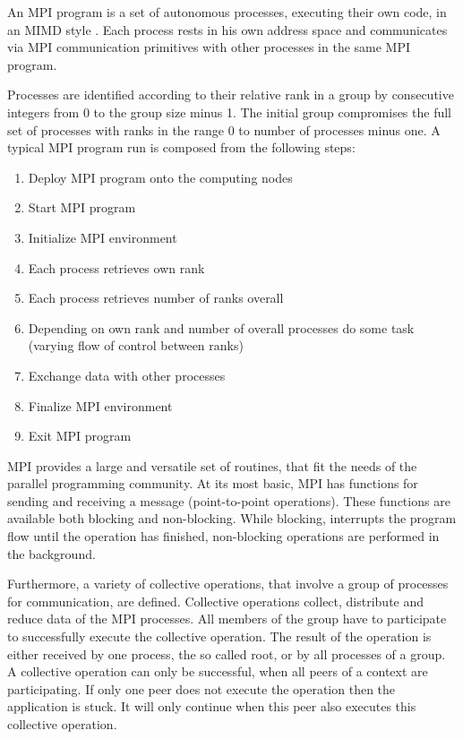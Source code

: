 An MPI program is a set of autonomous processes, executing their own
code, in an MIMD style \cite{Flynn:1972:COE:1952456.1952459}. Each
process rests in his own address space and communicates via MPI
communication primitives with other processes in the same MPI
program.

Processes are identified according to their relative rank in a group
by consecutive integers from 0 to the group size minus 1. The
initial group compromises the full set of processes with ranks in the
range 0 to number of processes minus one. A typical MPI program run is
composed from the following steps:

\begin{enumerate}
\item Deploy MPI program onto the computing nodes
\item Start MPI program
\item Initialize MPI environment
\item Each process retrieves own rank
\item Each process retrieves number of ranks overall
\item Depending on own rank and number of overall processes do some task\\
  (varying flow of control between ranks)
\item Exchange data with other processes
\item Finalize MPI environment
\item Exit MPI program
\end{enumerate}

MPI provides a large and versatile set of routines, that fit the needs
of the parallel programming community. At its most basic, MPI has
functions for sending and receiving a message (point-to-point
operations).  These functions are available both blocking and
non-blocking. While blocking, interrupts the program flow until the
operation has finished, non-blocking operations are performed in the
background.

Furthermore, a variety of collective operations, that involve a group
of processes for communication, are defined. Collective operations
collect, distribute and reduce data of the MPI processes.  All members
of the group have to participate to successfully execute the
collective operation.  The result of the operation is either received
by one process, the so called root, or by all processes of a group.  A
collective operation can only be successful, when all peers of a
context are participating. If only one peer does not execute the
operation then the application is stuck. It will only continue when
this peer also executes this collective operation.


